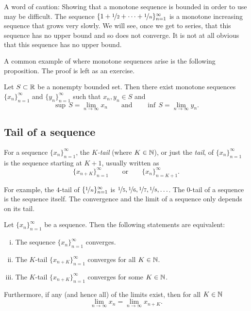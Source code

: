 \begin{example}
A word of caution:  Showing that a monotone sequence is bounded
in order to use  may be difficult.
The sequence
$\{ 1 + \nicefrac{1}{2} + \cdots + \nicefrac{1}{n} \}_{n=1}^\infty$
is a monotone increasing
sequence that grows very slowly.  We will see, once we get to series,
that this sequence has no upper bound and so does not converge.  It is not
at all obvious that this sequence has no upper bound.
\end{example}

A common example of where monotone sequences arise is the following
proposition.  The proof is left as an exercise.

\begin{prop} \label{prop:supinfseq}
Let $S \subset {\mathbb{R}}$ be a nonempty bounded set.
Then there exist monotone sequences
$\{ x_n \}_{n=1}^\infty$ and $\{ y_n \}_{n=1}^\infty$ such that $x_n, y_n \in S$ and
\begin{equation*}
\sup\,S = \lim_{n\to \infty} x_n \qquad \text{and} \qquad \inf\,S =
\lim_{n\to\infty} y_n .
\end{equation*}
\end{prop}

\subsection{Tail of a sequence}

\begin{defn}
For a sequence $\{ x_n \}_{n=1}^\infty$,
the \emph{$K$-tail} (where $K \in {\mathbb{N}}$),
or just the
\emph{tail}, of
$\{ x_n \}_{n=1}^\infty$ is the sequence starting at $K+1$, usually written as
\begin{equation*}
\{ x_{n+K} \}_{n=1}^\infty
\qquad \text{or} \qquad \{ x_n \}_{n=K+1}^\infty .
\end{equation*}
\end{defn}

For example, the $4$-tail of $\{ \nicefrac{1}{n} \}_{n=1}^\infty$ is
$\nicefrac{1}{5}, \nicefrac{1}{6}, \nicefrac{1}{7}, \nicefrac{1}{8},
\ldots$.  The $0$-tail of a sequence is the sequence itself.
The convergence and the limit of a sequence only depends on its tail.

\begin{prop}
Let $\{ x_n \}_{n=1}^\infty$ be a sequence.  Then the following
statements are equivalent:
\begin{enumerate}[(i)]
\item \label{prop:ktail:i}
The sequence $\{ x_n \}_{n=1}^\infty$ converges.
\item \label{prop:ktail:ii}
The $K$-tail $\{ x_{n+K} \}_{n=1}^\infty$ converges for all $K \in {\mathbb{N}}$.
\item \label{prop:ktail:iii}
The $K$-tail $\{ x_{n+K} \}_{n=1}^\infty$ converges for some $K \in {\mathbb{N}}$.
\end{enumerate}
Furthermore, if any (and hence all) of the limits exist, then for all $K \in {\mathbb{N}}$
\begin{equation*}
\lim_{n\to \infty} x_n = \lim_{n \to \infty} x_{n+K} .
\end{equation*}
\end{prop}

